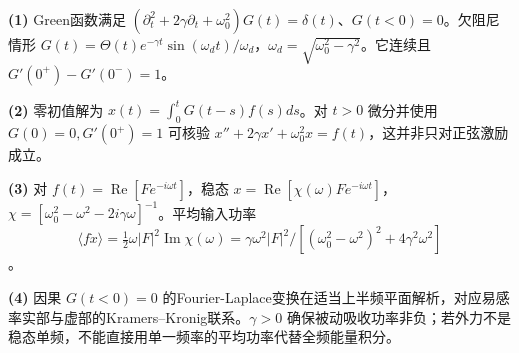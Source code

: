 \par\noindent\textbf{(1)} Green函数满足 \((\partial_t^2+2\gamma\partial_t+\omega_0^2)G(t)=\delta(t)\)、\(G(t<0)=0\)。欠阻尼情形 \(G(t)=\Theta(t)e^{-\gamma t}\sin(\omega_dt)/\omega_d\)，\(\omega_d=\sqrt{\omega_0^2-\gamma^2}\)。它连续且 \(G'(0^+)-G'(0^-)=1\)。
\par\noindent\textbf{(2)} 零初值解为 \(x(t)=\int_0^tG(t-s)f(s)ds\)。对 \(t>0\) 微分并使用 \(G(0)=0,G'(0^+)=1\) 可核验 \(x''+2\gamma x'+\omega_0^2x=f(t)\)，这并非只对正弦激励成立。
\par\noindent\textbf{(3)} 对 \(f(t)=\operatorname{Re}[F e^{-i\omega t}]\)，稳态 \(x=\operatorname{Re}[\chi(\omega)F e^{-i\omega t}]\)，\(\chi=[\omega_0^2-\omega^2-2i\gamma\omega]^{-1}\)。平均输入功率 \[\langle f\dot x\rangle=\tfrac12\omega|F|^2\operatorname{Im}\chi(\omega)=\gamma\omega^2|F|^2/[(\omega_0^2-\omega^2)^2+4\gamma^2\omega^2]\]。
\par\noindent\textbf{(4)} 因果 \(G(t<0)=0\) 的Fourier-Laplace变换在适当上半频平面解析，对应易感率实部与虚部的Kramers–Kronig联系。\(\gamma>0\) 确保被动吸收功率非负；若外力不是稳态单频，不能直接用单一频率的平均功率代替全频能量积分。
